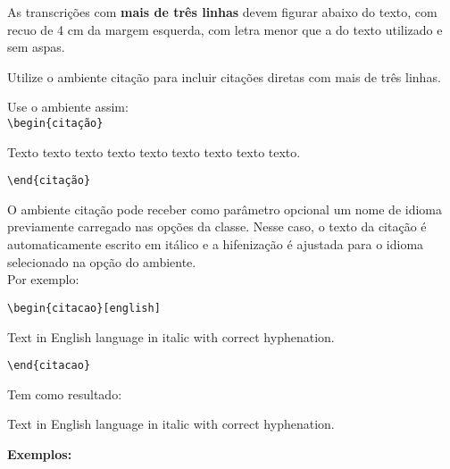 As transcrições com \textbf{mais de tr\^es linhas} devem figurar abaixo do texto, com recuo de 4 cm da margem esquerda, com letra menor que a do texto utilizado e sem aspas. 

Utilize o ambiente citação para incluir citações diretas com mais de tr\^es linhas.

Use o ambiente assim: \\

\verb+\begin{citação}+

Texto texto texto texto texto texto texto texto texto.

\verb+\end{citação}+

O ambiente citação pode receber como par\^ametro opcional um nome de idioma previamente carregado nas opções da classe. Nesse caso, o texto da citação \'e automaticamente escrito em it\'alico e a hifenização \'e ajustada para o idioma selecionado na opção do ambiente.\\
  Por exemplo:
 
\verb+\begin{citacao}[english]+
 
 Text in English language in italic with correct hyphenation.
 
\verb+\end{citacao}+
 
Tem como resultado:
\begin{citacao}[english]
Text in English language in italic with correct hyphenation. \\
\end{citacao}

\textbf{Exemplos:} 

